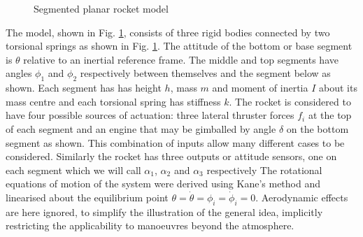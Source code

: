 \documentclass{mbd_fullpaper}
\begin{document}
\begin{figure}[h]
  \begin{center}
    
    \caption{Segmented planar rocket model \label{fig:rocket-model}}
  \end{center}
\end{figure}
The model, shown in Fig. \ref{fig:rocket-model}, consists of three rigid bodies connected by two torsional springs as shown in Fig. \ref{fig:rocket-model}.
The attitude of the bottom or base segment is $\theta$ relative to an inertial reference frame.
The middle and top segments have angles $\phi_1$ and $\phi_2$ respectively between themselves and the segment below as shown.
Each segment has has height $h$, mass $m$ and moment of inertia $I$ about its mass centre and each torsional spring has stiffness $k$.
The rocket is considered to have four possible sources of actuation: three lateral thruster forces $f_i$ at the top of each segment and an engine that may be gimballed by angle $\delta$ on the bottom segment as shown.
This combination of inputs allow many different cases to be considered.
Similarly the rocket has three outputs or attitude sensors, one on each segment which we will call $\alpha_1$, $\alpha_2$ and $\alpha_3$ respectively
The rotational equations of motion of the system were derived using Kane's method \cite{Kane1980} and linearised about the equilibrium point $\theta=\dot{\theta}=\phi_i=\dot{\phi}_i=0$.
Aerodynamic effects are here ignored, to simplify the illustration of the general idea, implicitly restricting the applicability to manoeuvres beyond the atmosphere.
\begin{multline}

\end{multline}
\begin{equation}

\end{equation}
\end{document}
